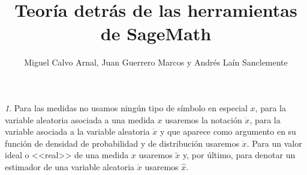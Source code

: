 \documentclass[11pt,a4paper,spanish]{article}
\title{Teoría detrás de las herramientas de SageMath}
\author{Miguel Calvo Arnal, Juan Guerrero Marcos y Andrés Laín Sanclemente}
\date{}
\numberwithin{equation}{section}
\numberwithin{table}{section}
\numberwithin{figure}{section}
\theoremstyle{definition}
\theoremstyle{remark}
\newtheorem{notation}{\protect\notationname}[section]
\theoremstyle{definition}
\theoremstyle{remark}
\theoremstyle{plain}
\theoremstyle{plain}
\theoremstyle{plain}
\theoremstyle{plain}
\theoremstyle{plain}
\theoremstyle{plain}
\providecommand{\notationname}{Notación}
\begin{document}
	\maketitle
	\newpage
	\tableofcontents
	\newpage
	
	\begin{notation}
		Para las medidas no usamos ningún tipo de símbolo en especial $x$,
		para la variable aleatoria asociada a una medida $x$ usaremos la
		notación $\mathring{x}$, para la variable asociada a la variable
		aleatoria $\mathring{x}$ y que aparece como argumento en su función
		de densidad de probabilidad y de distribución usaremos $\dot{x}$.
		Para un valor ideal o <<real>> de una medida $x$ usaremos $\tilde{x}$
		y, por último, para denotar un estimador de una variable aleatoria
		$\mathring{x}$ usaremos $\hat{x}$.
	\end{notation}
\end{document}
